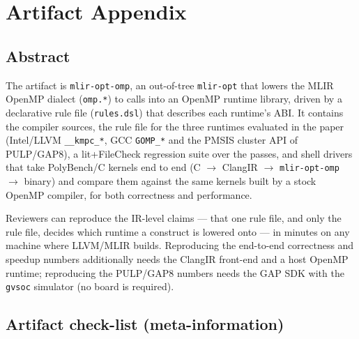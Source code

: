 
\appendix
\section{Artifact Appendix}

\subsection{Abstract}

The artifact is \texttt{mlir-opt-omp}, an out-of-tree \texttt{mlir-opt} that
lowers the MLIR OpenMP dialect (\texttt{omp.*}) to calls into an OpenMP
runtime library, driven by a declarative rule file (\texttt{rules.dsl}) that
describes each runtime's ABI.  It contains the compiler sources, the rule file
for the three runtimes evaluated in the paper (Intel/LLVM \texttt{\_\_kmpc\_*},
GCC \texttt{GOMP\_*} and the PMSIS cluster API of PULP/GAP8), a lit+FileCheck
regression suite over the passes, and shell drivers that take PolyBench/C
kernels end to end (C $\rightarrow$ ClangIR $\rightarrow$ \texttt{mlir-opt-omp}
$\rightarrow$ binary) and compare them against the same kernels built by a
stock OpenMP compiler, for both correctness and performance.

Reviewers can reproduce the IR-level claims --- that one rule file, and only
the rule file, decides which runtime a construct is lowered onto --- in minutes
on any machine where LLVM/MLIR builds.  Reproducing the end-to-end correctness
and speedup numbers additionally needs the ClangIR front-end and a host OpenMP
runtime; reproducing the PULP/GAP8 numbers needs the GAP SDK with the
\texttt{gvsoc} simulator (no board is required).

\subsection{Artifact check-list (meta-information)}


